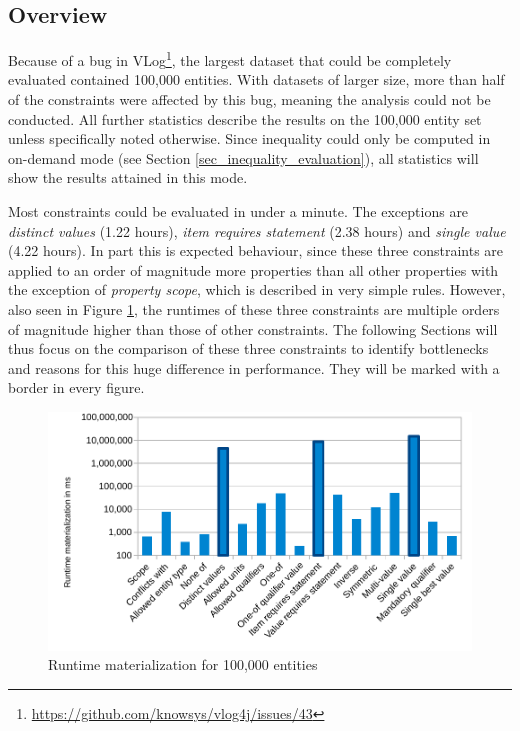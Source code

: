 \documentclass[hyperref,bachelorofscience,fleqn]{cgvpub}
\begin{document}
\subsection{Overview}

Because of a bug in VLog\footnote{\url{https://github.com/knowsys/vlog4j/issues/43}}, the largest dataset that could be completely evaluated contained 100,000 entities. With datasets of larger size, more than half of the constraints were affected by this bug, meaning the analysis could not be conducted. All further statistics describe the results on the 100,000 entity set unless specifically noted otherwise. Since inequality could only be computed in on-demand mode (see Section  \ref{sec_inequality_evaluation}), all statistics will show the results attained in this mode.

Most constraints could be evaluated in under a minute. The exceptions are \emph{distinct values} (1.22 hours), \emph{item requires statement} (2.38 hours) and \emph{single value} (4.22 hours). In part this is expected behaviour, since these three constraints are applied to an order of magnitude more properties than all other properties with the exception of \emph{property scope}, which is described in very simple rules. However, also seen in Figure \ref{fig_runtime}, the runtimes of these three constraints are multiple orders of magnitude higher than those of other constraints. The following Sections will thus focus on the comparison of these three constraints to identify bottlenecks and reasons for this huge difference in performance. They will be marked with a border in every figure.

\begin{figure}
\includegraphics[width=\linewidth]{images/runtime100,000.pdf}
\caption{Runtime materialization for 100,000 entities}\label{fig_runtime}
\end{figure}
\end{document}
